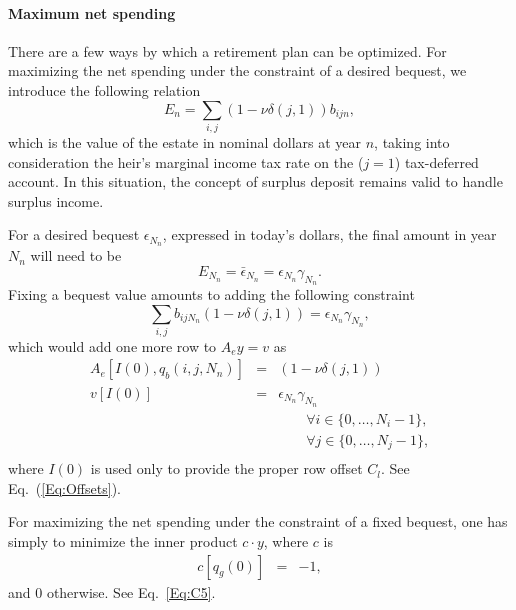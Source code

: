 \documentclass{report}[fleqn,11pt]
\begin{document}
\paragraph*{Maximum net spending}
There are a few ways by which a retirement plan can be optimized. For maximizing the net spending under
the constraint of a desired bequest, we introduce the following relation
\begin{equation}
	\label{Eq:Bequest}
	E_n = \sum_{i,j} (1 - \nu\delta(j, 1)) b_{ijn},
\end{equation}
which is the value of the estate in nominal dollars at year $n$,
taking into consideration the heir's marginal income tax rate on the ($j=1$) tax-deferred account. 
In this situation, the concept of surplus deposit remains valid to handle
surplus income.

For a desired bequest $\epsilon_{N_n}$, expressed in today's
dollars, the final amount in year $N_n$ will need to be
\begin{equation}
	E_{N_n} = \bar\epsilon_{N_n} = \epsilon_{N_n} \gamma_{N_n}.
\end{equation}
Fixing a bequest value amounts to adding the following constraint
\begin{equation}
	\sum_{i,j} b_{ijN_n} (1 - \nu\delta(j, 1)) = \epsilon_{N_n} \gamma_{N_n},
\end{equation}
which would add one more row to $A_ey = v$ as
\begin{eqnarray}
	A_e[I(0), q_b(i, j, N_n)] &=& (1 - \nu\delta(j, 1)) \nonumber \\
	v[I(0)] &=& \epsilon_{N_n}\gamma_{N_n} \\
	&&\qquad\forall i \in \{0,\ldots, N_i-1\},\nonumber\\
	&&\qquad\forall j \in \{0,\ldots, N_j-1\},\nonumber\\
\end{eqnarray}
where $I(0)$ is used only to provide the proper row offset $C_l$. See Eq.~(\ref{Eq:Offsets}).

For maximizing the net spending under the constraint of a fixed bequest, one has simply to
minimize the inner product $c\cdot y$, where $c$ is
\begin{eqnarray}
	c[q_g(0)] &=& -1,
\end{eqnarray}
and 0 otherwise. See Eq.~\ref{Eq:C5}.
\end{document}

